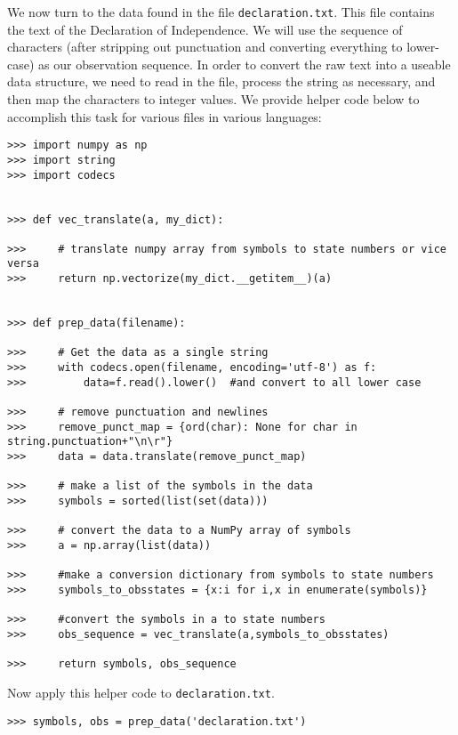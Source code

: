 We now turn to the data found in the file {\tt declaration.txt}.
This file contains the text of the Declaration of Independence.
We will use the sequence of characters (after stripping out punctuation and converting everything to lower-case) as our observation sequence.
In order to convert the raw text into a useable data structure, we need to read in the file, process the string as necessary, and then map the characters to integer values.
We provide helper code below to accomplish this task for various files in various languages:
\begin{lstlisting}
>>> import numpy as np
>>> import string
>>> import codecs


>>> def vec_translate(a, my_dict):

>>>     # translate numpy array from symbols to state numbers or vice versa
>>>     return np.vectorize(my_dict.__getitem__)(a)


>>> def prep_data(filename):

>>>     # Get the data as a single string
>>>     with codecs.open(filename, encoding='utf-8') as f:
>>>         data=f.read().lower()  #and convert to all lower case

>>>     # remove punctuation and newlines
>>>     remove_punct_map = {ord(char): None for char in string.punctuation+"\n\r"}
>>>     data = data.translate(remove_punct_map)

>>>     # make a list of the symbols in the data
>>>     symbols = sorted(list(set(data)))

>>>     # convert the data to a NumPy array of symbols
>>>     a = np.array(list(data))

>>>     #make a conversion dictionary from symbols to state numbers
>>>     symbols_to_obsstates = {x:i for i,x in enumerate(symbols)}

>>>     #convert the symbols in a to state numbers
>>>     obs_sequence = vec_translate(a,symbols_to_obsstates)

>>>     return symbols, obs_sequence
\end{lstlisting}

Now apply this helper code to \texttt{declaration.txt}.
\begin{lstlisting}
>>> symbols, obs = prep_data('declaration.txt')
\end{lstlisting}

